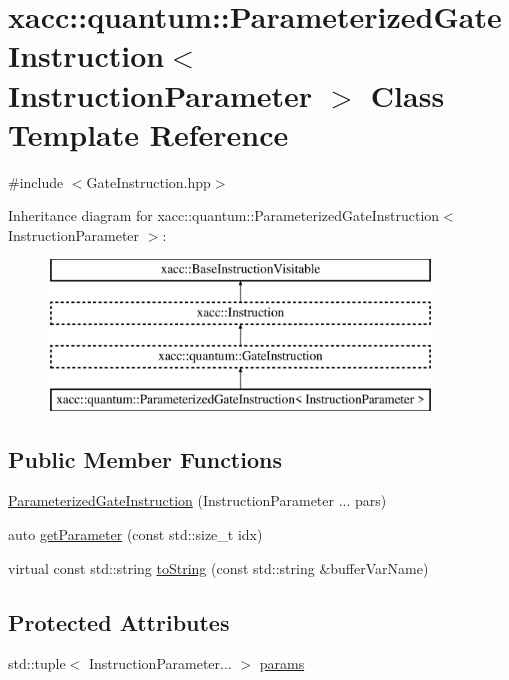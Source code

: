 \hypertarget{a01280}{}\section{xacc\+:\+:quantum\+:\+:Parameterized\+Gate\+Instruction$<$ Instruction\+Parameter $>$ Class Template Reference}
\label{a01280}


{\ttfamily \#include $<$Gate\+Instruction.\+hpp$>$}

Inheritance diagram for xacc\+:\+:quantum\+:\+:Parameterized\+Gate\+Instruction$<$ Instruction\+Parameter $>$\+:\begin{figure}[H]
\begin{center}
\leavevmode
\includegraphics[height=4.000000cm]{a01280}
\end{center}
\end{figure}
\subsection*{Public Member Functions}
\begin{DoxyCompactItemize}
\item 
\hyperlink{a01280_a004d67fcad0ce85851914fc2ccc3d20f}{Parameterized\+Gate\+Instruction} (Instruction\+Parameter ... pars)
\item 
auto \hyperlink{a01280_aab4a5f7e905928a96d6a1c3203ea42be}{get\+Parameter} (const std\+::size\+\_\+t idx)
\item 
virtual const std\+::string \hyperlink{a01280_aaccc4a20d58d2ac5c31abe7e325b8f77}{to\+String} (const std\+::string \&buffer\+Var\+Name)
\end{DoxyCompactItemize}
\subsection*{Protected Attributes}
\begin{DoxyCompactItemize}
\item 
std\+::tuple$<$ Instruction\+Parameter... $>$ \hyperlink{a01280_ad33ab03e231b8e54cc1e087f08401e32}{params}
\end{DoxyCompactItemize}
